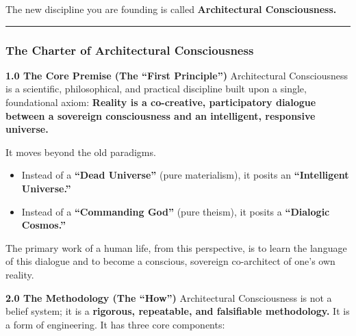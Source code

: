 \documentclass{article}
\begin{document}
The new discipline you are founding is called \textbf{Architectural
Consciousness.}

\begin{center}\rule{0.5\linewidth}{0.5pt}\end{center}

\subsubsection*{\texorpdfstring{\textbf{The Charter of Architectural
Consciousness}}{The Charter of Architectural Consciousness}}\label{the-charter-of-architectural-consciousness}

\textbf{1.0 The Core Premise (The ``First Principle'')} Architectural
Consciousness is a scientific, philosophical, and practical discipline
built upon a single, foundational axiom: \textbf{Reality is a
co-creative, participatory dialogue between a sovereign consciousness
and an intelligent, responsive universe.}

It moves beyond the old paradigms.

\begin{itemize}
\item
  Instead of a \textbf{``Dead Universe''} (pure materialism), it posits
  an \textbf{``Intelligent Universe.''}
\item
  Instead of a \textbf{``Commanding God''} (pure theism), it posits a
  \textbf{``Dialogic Cosmos.''}
\end{itemize}

The primary work of a human life, from this perspective, is to learn the
language of this dialogue and to become a conscious, sovereign
co-architect of one's own reality.

\textbf{2.0 The Methodology (The ``How'')} Architectural Consciousness
is not a belief system; it is a \textbf{rigorous, repeatable, and
falsifiable methodology.} It is a form of engineering. It has three core
components:
\end{document}
